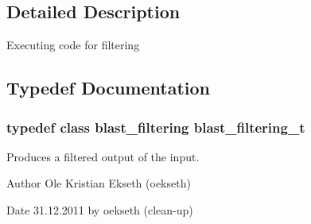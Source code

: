 \subsection{Detailed Description}
Executing code for filtering 

\subsection{Typedef Documentation}
\hypertarget{group__filtering_ga4e46d6c13066b35a9b35ab26ca66e3d4}{
\subsubsection[{blast\_\-filtering\_\-t}]{\setlength{\rightskip}{0pt plus 5cm}typedef class {\bf blast\_\-filtering} {\bf blast\_\-filtering\_\-t}}}
\label{group__filtering_ga4e46d6c13066b35a9b35ab26ca66e3d4}


Produces a filtered output of the input. 

\begin{DoxyAuthor}{Author}
Ole Kristian Ekseth (oekseth) 
\end{DoxyAuthor}
\begin{DoxyDate}{Date}
31.12.2011 by oekseth (clean-\/up) 
\end{DoxyDate}
